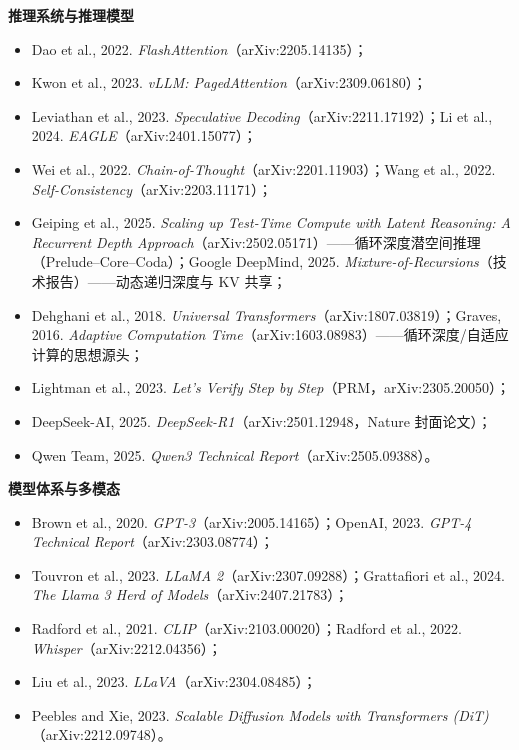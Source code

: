 \documentclass[12pt,a4paper]{article}
\begin{document}
\textbf{推理系统与推理模型}
\begin{itemize}
  \item Dao et al., 2022. \emph{FlashAttention}（arXiv:2205.14135）；
  \item Kwon et al., 2023. \emph{vLLM: PagedAttention}（arXiv:2309.06180）；
  \item Leviathan et al., 2023. \emph{Speculative Decoding}（arXiv:2211.17192）；Li et al., 2024. \emph{EAGLE}（arXiv:2401.15077）；
  \item Wei et al., 2022. \emph{Chain-of-Thought}（arXiv:2201.11903）；Wang et al., 2022. \emph{Self-Consistency}（arXiv:2203.11171）；
  \item Geiping et al., 2025. \emph{Scaling up Test-Time Compute with Latent Reasoning: A Recurrent Depth Approach}（arXiv:2502.05171）——循环深度潜空间推理（Prelude--Core--Coda）；Google DeepMind, 2025. \emph{Mixture-of-Recursions}（技术报告）——动态递归深度与 KV 共享；
  \item Dehghani et al., 2018. \emph{Universal Transformers}（arXiv:1807.03819）；Graves, 2016. \emph{Adaptive Computation Time}（arXiv:1603.08983）——循环深度/自适应计算的思想源头；
  \item Lightman et al., 2023. \emph{Let's Verify Step by Step}（PRM，arXiv:2305.20050）；
  \item DeepSeek-AI, 2025. \emph{DeepSeek-R1}（arXiv:2501.12948，Nature 封面论文）；
  \item Qwen Team, 2025. \emph{Qwen3 Technical Report}（arXiv:2505.09388）。
\end{itemize}

\textbf{模型体系与多模态}
\begin{itemize}
  \item Brown et al., 2020. \emph{GPT-3}（arXiv:2005.14165）；OpenAI, 2023. \emph{GPT-4 Technical Report}（arXiv:2303.08774）；
  \item Touvron et al., 2023. \emph{LLaMA 2}（arXiv:2307.09288）；Grattafiori et al., 2024. \emph{The Llama 3 Herd of Models}（arXiv:2407.21783）；
  \item Radford et al., 2021. \emph{CLIP}（arXiv:2103.00020）；Radford et al., 2022. \emph{Whisper}（arXiv:2212.04356）；
  \item Liu et al., 2023. \emph{LLaVA}（arXiv:2304.08485）；
  \item Peebles and Xie, 2023. \emph{Scalable Diffusion Models with Transformers (DiT)}（arXiv:2212.09748）。
\end{itemize}
\end{document}
